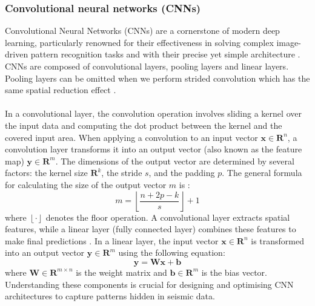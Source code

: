 \subsubsection{Convolutional neural networks (CNNs)} 
Convolutional Neural Networks (CNNs) are a cornerstone of modern deep learning, particularly renowned for their effectiveness in solving complex image-driven pattern recognition tasks and with their precise yet simple architecture \cite{o2015introduction}. CNNs are composed of convolutional layers, pooling layers and linear layers. Pooling layers can be omitted when we perform strided convolution which has the same spatial reduction effect \cite{o2015introduction, alzubaidi2021review}.
\\\\
In a convolutional layer, the convolution operation involves sliding a kernel over the input data and computing the dot product between the kernel and the covered input area. When applying a convolution to an input vector $\mathbf{x} \in \mathbf{R}^n$, a convolution layer transforms it into an output vector (also known as the feature map) $\mathbf{y} \in \mathbf{R}^m$. The dimensions of the output vector are determined by several factors: the kernel size $\mathbf{R}^k$, the stride $s$, and the padding $p$. The general formula for calculating the size of the output vector $m$ is \cite{o2015introduction}:
\begin{equation}
	m=\left\lfloor\frac{n+2 p-k}{s}\right\rfloor+1
	\label{eq:cnn}
\end{equation}
\noindent where $\left\lfloor\cdot\right\rfloor$ denotes the floor operation. A convolutional layer extracts spatial features, while a linear layer (fully connected layer) combines these features to make final predictions \cite{wu2017introduction}. In a linear layer, the input vector $\mathbf{x} \in \mathbf{R}^n$ is transformed into an output vector $\mathbf{y} \in \mathbf{R}^m$ using the following equation:
\begin{equation}
	\mathbf{y}=\mathbf{W} \mathbf{x}+\mathbf{b}
	\label{eq:linear}
\end{equation}
where $\mathbf{W} \in \mathbf{R}^{m \times n}$ is the weight matrix and $\mathbf{b} \in \mathbf{R}^m$ is the bias vector. Understanding these components is crucial for designing and optimising CNN architectures to capture patterns hidden in seismic data. 

